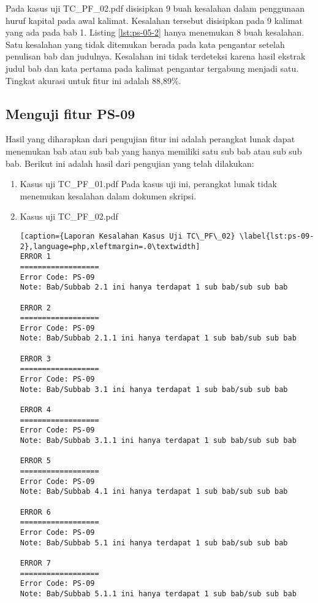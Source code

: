 
Pada kasus uji TC\_PF\_02.pdf disisipkan 9 buah kesalahan dalam penggunaan huruf kapital pada awal kalimat. Kesalahan tersebut disisipkan pada 9 kalimat yang ada pada bab 1. Listing \ref{lst:ps-05-2} hanya menemukan 8 buah kesalahan. Satu kesalahan yang tidak ditemukan berada pada kata pengantar setelah penulisan bab dan judulnya. Kesalahan ini tidak terdeteksi karena hasil ekstrak judul bab dan kata pertama pada kalimat pengantar tergabung menjadi satu. Tingkat akurasi untuk fitur ini adalah 88,89\%.

\subsection{Menguji fitur PS-09}
Hasil yang diharapkan dari pengujian fitur ini adalah perangkat lunak dapat menemukan bab atau sub bab yang hanya memiliki satu sub bab atau sub sub bab. Berikut ini adalah hasil dari pengujian yang telah dilakukan:

\begin{enumerate}
	\item Kasus uji TC\_PF\_01.pdf \newline
	Pada kasus uji ini, perangkat lunak tidak menemukan kesalahan dalam dokumen skripsi.
	
	\item Kasus uji TC\_PF\_02.pdf
	
\begin{lstlisting}[caption={Laporan Kesalahan Kasus Uji TC\_PF\_02}	\label{lst:ps-09-2},language=php,xleftmargin=.0\textwidth]
ERROR 1
==================
Error Code: PS-09
Note: Bab/Subbab 2.1 ini hanya terdapat 1 sub bab/sub sub bab

ERROR 2
==================
Error Code: PS-09
Note: Bab/Subbab 2.1.1 ini hanya terdapat 1 sub bab/sub sub bab

ERROR 3
==================
Error Code: PS-09
Note: Bab/Subbab 3.1 ini hanya terdapat 1 sub bab/sub sub bab

ERROR 4
==================
Error Code: PS-09
Note: Bab/Subbab 3.1.1 ini hanya terdapat 1 sub bab/sub sub bab

ERROR 5
==================
Error Code: PS-09
Note: Bab/Subbab 4.1 ini hanya terdapat 1 sub bab/sub sub bab

ERROR 6
==================
Error Code: PS-09
Note: Bab/Subbab 5.1 ini hanya terdapat 1 sub bab/sub sub bab

ERROR 7
==================
Error Code: PS-09
Note: Bab/Subbab 5.1.1 ini hanya terdapat 1 sub bab/sub sub bab
\end{lstlisting}
\end{enumerate}

